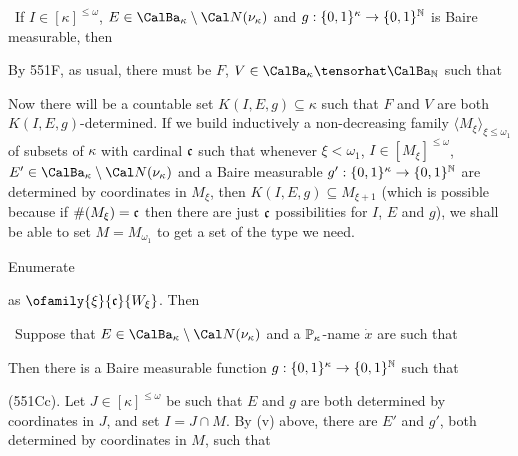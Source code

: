 {

\noindent\Prf\ If $I\in[\kappa]^{\le\omega}$,
$E\in\CalBa_{\kappa}\setminus\Cal N(\nu_{\kappa})$ and
$g:\{0,1\}^{\kappa}\to\{0,1\}^{\Bbb N}$ is Baire measurable, then


\noindent By 551F, as usual, there must be $F$,
$V\in\CalBa_{\kappa}\tensorhat\CalBa_{\Bbb N}$ such that


\noindent Now there will be a countable set $K(I,E,g)\subseteq\kappa$ such
that $F$ and $V$ are both $K(I,E,g)$-determined.
If we build inductively a non-decreasing family
$\langle M_{\xi}\rangle_{\xi\le\omega_1}$ of
subsets of $\kappa$ with cardinal $\frak c$ such that whenever
$\xi<\omega_1$, $I\in[M_{\xi}]^{\le\omega}$,
$E'\in\CalBa_{\kappa}\setminus\Cal N(\nu_{\kappa})$ and a Baire measurable
$g':\{0,1\}^{\kappa}\to\{0,1\}^{\Bbb N}$ are determined by coordinates in
$M_{\xi}$, then $K(I,E,g)\subseteq M_{\xi+1}$ (which is possible because if
$\#(M_{\xi})=\frak c$ then there are just $\frak c$ possibilities for $I$,
$E$ and $g$), we shall be able to set $M=M_{\omega_1}$ to get a set of the
type we need.\ \Qed

Enumerate


\noindent as $\ofamily{\xi}{\frak c}{W_{\xi}}$.
Then


\noindent\Prf\ Suppose that
$E\in\CalBa_{\kappa}\setminus\Cal N(\nu_{\kappa})$ and a $\Bbb P_{\kappa}$-name
$\dot x$ are such that


\noindent Then there is a Baire measurable
function $g:\{0,1\}^{\kappa}\to\{0,1\}^{\Bbb N}$ such that


\noindent (551Cc).
Let $J\in[\kappa]^{\le\omega}$ be such that $E$ and $g$ are both
determined by coordinates in $J$, and set $I=J\cap M$.
By (v) above, there are $E'$ and $g'$, both
determined by coordinates in $M$, such that

}
